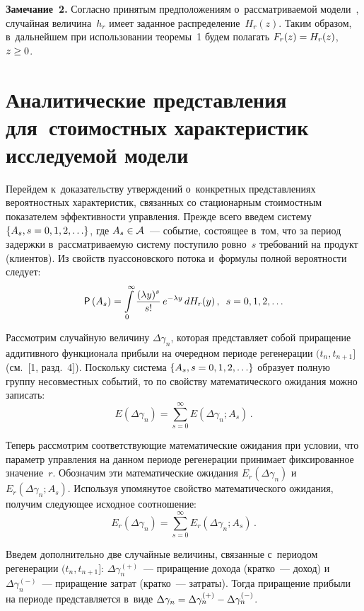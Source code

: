 \begin{multicols}{2}
  \smallskip
  
  \noindent
  \textbf{Замечание~2.} Согласно принятым предположениям 
о~рас\-смат\-ри\-ва\-емой модели~\cite{1-sn}, случайная величина~$h_r$ имеет 
заданное рас\-пре\-де\-ле\-ние~$H_r(z)$. Таким образом, в~дальнейшем при 
использовании тео\-ре\-мы~1 будем полагать $F_r(z)\hm= H_r(z)$, $z\hm\geq 0$.
  
  
\section{Аналитические представления для~стоимостных 
характеристик исследуемой модели}

  Перейдем к~доказательству утверждений о~конкретных пред\-став\-ле\-ни\-ях 
вероятностных характеристик, связанных со стационарным стоимостным 
показателем эф\-фек\-тив\-ности управ\-ле\-ния. 
%
Прежде всего введем систему $\{A_s, 
s\hm=0,1,2,\ldots\}$, где $A_s\hm\in \mathcal{A}$~--- событие, состоящее в~том, 
что за период задержки в~рас\-смат\-ри\-ва\-емую сис\-те\-му по\-сту\-пи\-ло ров\-но~$s$ 
требований на продукт (клиентов). Из свойств пуассоновского потока 
и~формулы пол\-ной ве\-ро\-ят\-ности следует:
  $$
  {\sf P}\left( A_s\right) =\int\limits_0^\infty \displaystyle\frac{\displaystyle (\lambda y)^s\mathstrut}{\displaystyle s!\mathstrut}\,e^{-\lambda y} 
\,dH_r(y)\,,\enskip s=0,1,2,\ldots
  $$
  
  Рассмотрим случайную величину $\Delta\gamma_n$, которая пред\-став\-ля\-ет 
собой приращение аддитивного функционала прибыли на очередном периоде 
регенерации $(t_n,t_{n+1}]$ (см.~[1, разд.~4]). Поскольку сис\-те\-ма 
$\{A_s, s\hm=0,1,2,\ldots\}$ образует пол\-ную группу несовместных событий, то 
по свойству математического ожидания можно записать:
  $$
  E\left( \Delta \gamma_n\right) =\sum\limits_{s=0}^\infty E\left( \Delta\gamma_n; 
A_s\right)\,.
  $$
  
  Теперь рассмотрим соответствующие математические ожидания при 
условии, что параметр управ\-ле\-ния на данном периоде регенерации принимает 
фиксированное значение~$r$. Обозначим эти математические ожидания 
$E_r(\Delta\gamma_n)$ и~$E_r(\Delta\gamma_n;A_s)$. Используя упомянутое 
свойство математического ожидания, получим сле\-ду\-ющее исходное 
соотношение:
  \begin{equation}
  E_r\left(\Delta\gamma_n\right) =\sum\limits^\infty_{s=0} 
E_r\left(\Delta\gamma_n;A_s\right)\,.
  \label{e7-sn}
  \end{equation}
  
  Введем дополнительно две случайные величины, связанные с~периодом 
регенерации $(t_n, t_{n+1}]$: $\Delta\gamma_n^{(+)}$~--- приращение дохода 
(кратко~--- доход) и~$\Delta\gamma_n^{(-)}$~--- приращение за\-трат (кратко~--- 
за\-тра\-ты). Тогда приращение прибыли на периоде пред\-став\-ля\-ет\-ся в~виде 
$\Delta\gamma_n\hm= \Delta\gamma_n^{(+)}\hm- \Delta\gamma_n^{(-)}$.
  

\end{multicols}
